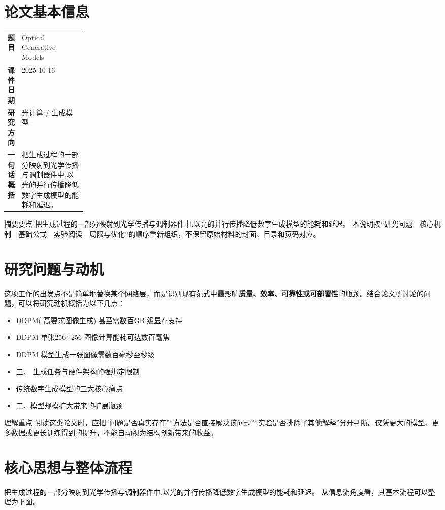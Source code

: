 \documentclass[UTF8,11pt,a4paper]{ctexart}
\newcommand{\term}[1]{\textbf{\textcolor{mainblue}{#1}}}
\begin{document}
\section{论文基本信息}
\begin{center}
\begin{tabularx}{0.94\linewidth}{>{\bfseries}p{0.18\linewidth}X}
\toprule
题目 & Optical Generative Models\\
课件日期 & 2025-10-16\\
研究方向 & 光计算 / 生成模型\\
一句话概括 & 把生成过程的一部分映射到光学传播与调制器件中,以光的并行传播降低数字生成模型的能耗和延迟。\\
\bottomrule
\end{tabularx}
\end{center}

\begin{infobox}{摘要要点}
把生成过程的一部分映射到光学传播与调制器件中,以光的并行传播降低数字生成模型的能耗和延迟。 本说明按“研究问题—核心机制—基础公式—实验阅读—局限与优化”的顺序重新组织，不保留原始材料的封面、目录和页码对应。
\end{infobox}

\section{研究问题与动机}
这项工作的出发点不是简单地替换某个网络层，而是识别现有范式中最影响\term{质量、效率、可靠性或可部署性}的瓶颈。结合论文所讨论的问题，可以将研究动机概括为以下几点：
\begin{itemize}
\item DDPM( 高要求图像生成) 甚至需数百GB 级显存支持
\item DDPM 单张256×256 图像计算能耗可达数百毫焦
\item DDPM 模型生成一张图像需数百毫秒至秒级
\item 三、 生成任务与硬件架构的强绑定限制
\item 传统数字生成模型的三大核心痛点
\item 二、模型规模扩大带来的扩展瓶颈
\end{itemize}

\begin{notebox}{理解重点}
阅读这类论文时，应把“问题是否真实存在”“方法是否直接解决该问题”“实验是否排除了其他解释”分开判断。仅凭更大的模型、更多数据或更长训练得到的提升，不能自动视为结构创新带来的收益。
\end{notebox}

\section{核心思想与整体流程}
把生成过程的一部分映射到光学传播与调制器件中,以光的并行传播降低数字生成模型的能耗和延迟。 从信息流角度看，其基本流程可以整理为下图。
\end{document}
